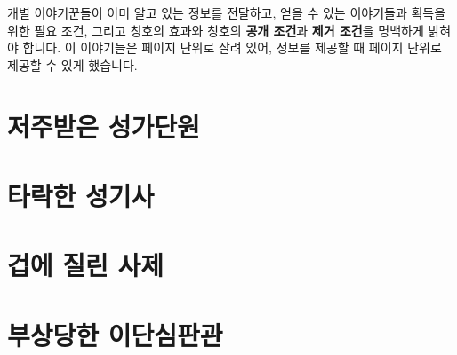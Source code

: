 \documentclass{report}
\begin{document}
	개별 이야기꾼들이 이미 알고 있는 정보를 전달하고, 얻을 수 있는 이야기들과 획득을 위한 필요 조건, 그리고 칭호의 효과와 칭호의 \textbf{공개 조건}과 \textbf{제거 조건}을 명백하게 밝혀야 합니다. 이 이야기들은 페이지 단위로 잘려 있어, 정보를 제공할 때 페이지 단위로 제공할 수 있게 했습니다.
	
	\pagebreak \hypertarget{cursed-bard}{}
	\section{저주받은 성가단원}
	
	\pagebreak \hypertarget{corrupt-paladin}{}
	\section{타락한 성기사}
	
	\pagebreak \hypertarget{cowardly-priest}{}
	\section{겁에 질린 사제}
	
	\pagebreak \hypertarget{hurt-rogue}{}
	\section{부상당한 이단심판관}
	
\end{document}
